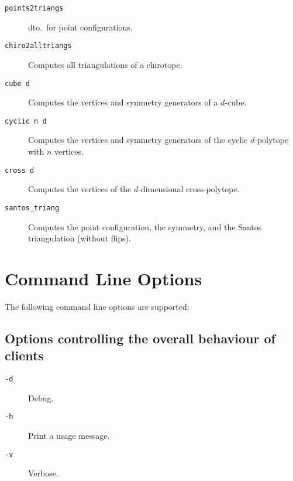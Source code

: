 \documentclass[12pt,a4paper]{article}
\begin{document}
\begin{description}
\item[\texttt{points2triangs}] dto.\ for point configurations.
\item[\texttt{chiro2alltriangs}] Computes all triangulations of a chirotope.
\item[\texttt{cube d}] Computes the vertices and symmetry generators of a
  $d$-cube.
\item[\texttt{cyclic n d}] Computes the vertices and symmetry generators of
  the cyclic $d$-polytope with $n$ vertices.
\item[\texttt{cross d}] Computes the vertices of the $d$-dimensional cross-polytope.
\item[\texttt{santos\_triang}] Computes the point configuration, the symmetry,
  and the Santos triangulation (without flips).
\end{description}



\section{Command Line Options}
\label{sec:options}

The following command line options are supported:

\subsection*{Options controlling the overall behaviour of clients}
\begin{description}
\item[\texttt{-d}] Debug.
\item[\texttt{-h}] Print a usage message.
\item[\texttt{-v}] Verbose.
\end{description}
\end{document}
